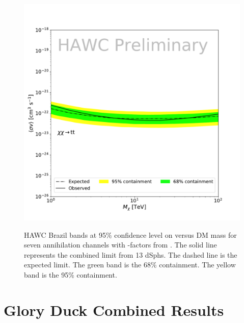 \begin{figure}[t]
{    \includegraphics[scale=0.21]{figures/glory_duck/hawc/GD_BrazilBand_tt.pdf}
    }
    \caption{HAWC Brazil bands at 95\% confidence level on \sv versus DM mass for seven annihilation channels with \J-factors from \GS \cite{Geringer-Sameth:2014yza}. The solid line represents the combined limit from 13 dSphs. The dashed line is the expected limit. The green band is the 68\% containment. The yellow band is the 95\% containment.}
\label{fig:hawc_brazil_band}
\end{figure}

\section{Glory Duck Combined Results}\label{sec:results}

